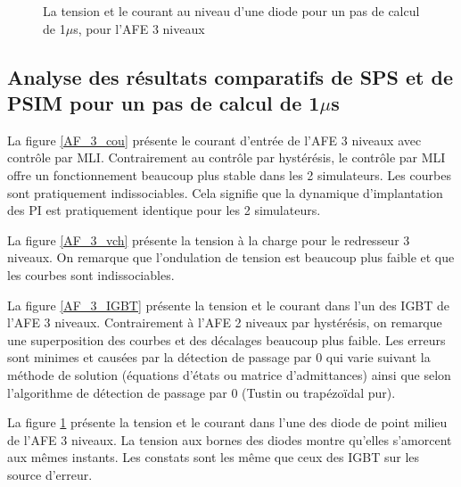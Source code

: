 \begin{figure}[htb]
\caption{La tension et le courant au niveau d'une diode pour un pas de calcul de 1$\mu$s, pour l'AFE 3 niveaux}
\label{AF_3_DIODE}
\end{figure}


\clearpage

\subsection{Analyse des résultats comparatifs de SPS et de PSIM pour un pas de calcul de 1$\mu$s}
La figure \ref{AF_3_cou} présente le courant d'entrée de l'AFE 3 niveaux avec contrôle par MLI. Contrairement au contrôle par hystérésis, le contrôle par MLI offre un fonctionnement beaucoup plus stable dans les 2 simulateurs. Les courbes sont pratiquement indissociables. Cela signifie que la dynamique d'implantation des PI est pratiquement identique pour les 2 simulateurs.

La figure \ref{AF_3_vch} présente la tension à la charge pour le redresseur 3 niveaux. On remarque que l'ondulation de tension est beaucoup plus faible et que les courbes sont indissociables. 

La figure \ref{AF_3_IGBT} présente la tension et le courant dans l'un des IGBT de l'AFE 3 niveaux. Contrairement à l'AFE 2 niveaux par hystérésis, on remarque une superposition des courbes et des décalages beaucoup plus faible. Les erreurs sont minimes et causées par la détection de passage par 0 qui varie suivant la méthode de solution (équations d'états ou matrice d'admittances) ainsi que selon l'algorithme de détection de passage par 0 (Tustin ou trapézoïdal pur).

La figure \ref{AF_3_DIODE} présente la tension et le courant dans l'une des diode de point milieu de l'AFE 3 niveaux. La tension aux bornes des diodes montre qu'elles s'amorcent aux mêmes instants. Les constats sont les même que ceux des IGBT sur les source d'erreur. 
